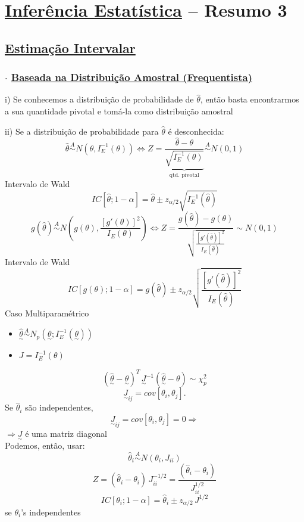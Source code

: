 \documentclass[11pt,a4paper]{article}
\newcommand{\vt}[1]{\underset{\sim}{#1}}      %
\begin{document}
\section*{\underline{Inferência Estatística} -- Resumo 3}

\subsection*{\underline{Estimação Intervalar}}

\subsubsection*{$\cdot$ \underline{Baseada na Distribuição Amostral (Frequentista)}}
i) Se conhecemos a distribuição de probabilidade de $\hat{\theta}$, então basta encontrarmos a sua quantidade pivotal e tomá-la como distribuição amostral

ii) Se a distribuição de probabilidade para $\hat{\theta}$ é desconhecida:
\[ \hat{\theta} \overset{A}{\sim} N(\theta,I_E^{-1}(\theta)) \iff Z = \underbrace{\frac{\hat{\theta}-\theta}{\sqrt{I_E^{-1}(\theta)}}}_{\text{qtd. pivotal}} \overset{A}{\sim} N(0,1) \]
Intervalo de Wald
\[ IC[\hat{\theta};1-\alpha] = \hat{\theta} \pm z_{\alpha/2}\sqrt{I_E^{-1}(\hat{\theta})} \]
\[ g(\hat{\theta}) \overset{A}{\sim} N\!\left(g(\theta),\frac{[g'(\theta)]^2}{I_E(\theta)}\right) \iff Z = \frac{g(\hat{\theta})-g(\theta)}{\sqrt{\frac{[g'(\hat{\theta})]^2}{I_E(\hat{\theta})}}} \sim N(0,1) \]
Intervalo de Wald
\[ IC[g(\theta);1-\alpha] = g(\hat{\theta}) \pm z_{\alpha/2}\sqrt{\frac{[g'(\hat{\theta})]^2}{I_E(\hat{\theta})}} \]
Caso Multiparamétrico
\begin{itemize}[label=$\cdot$]
  \item $\hat{\vt{\theta}} \overset{A}{\sim} N_p(\vt{\theta};I_E^{-1}(\vt{\theta}))$
  \item $J = I_E^{-1}(\theta)$
\end{itemize}
\[ (\hat{\vt{\theta}}-\vt{\theta})^T\,\vt{J}^{-1}(\hat{\vt{\theta}}-\theta) \sim \chi^2_p \]
\[ \vt{J}_{ij} = cov[\theta_i,\theta_j]. \]
Se $\hat{\theta}_i$ são independentes,
\[ \vt{J}_{ij} = cov[\theta_i,\theta_j] = 0 \Rightarrow \]
$\Rightarrow \vt{J}$ é uma matriz diagonal \\
Podemos, então, usar:
\[ \hat{\theta}_i \overset{A}{\sim} N(\theta_i,J_{ii}) \]
\[ Z = (\hat{\theta}_i-\theta_i)\,J_{ii}^{-1/2} = \frac{(\hat{\theta}_i-\theta_i)}{J_{ii}^{1/2}} \]
\[ IC[\theta_i;1-\alpha] = \hat{\theta}_i \pm z_{\alpha/2}\,J^{1/2} \]
se $\theta_i$'s independentes
\end{document}
